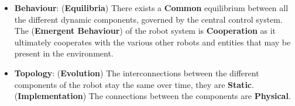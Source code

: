 \begin{itemize}
\begin{itemize}
\begin{itemize}
\begin{itemize}
                \item \checkmark \textbf{Behaviour}:
                (\textbf{Equilibria}) There exists a \textbf{Common} equilibrium between all the different dynamic components, governed by the central control system. The (\textbf{Emergent Behaviour}) of the robot system is \textbf{Cooperation} as it ultimately cooperates with the various other robots and entities that may be present in the environment. 
                \item \checkmark \textbf{Topology}: (\textbf{Evolution}) The interconnections between the different components of the robot stay the same over time, they are \textbf{Static}. (\textbf{Implementation}) The connections between the components are \textbf{Physical}.
            \end{itemize}
            

\end{itemize}
\end{itemize}
\end{itemize}
